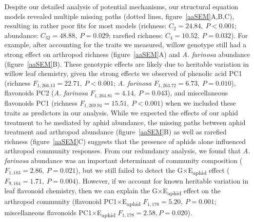 \documentclass[11pt]{article}
\begin{document}
Despite our detailed analysis of potential mechanisms, our structural
equation models revealed multiple missing paths (dotted lines, figure~\ref{aaSEM}A,B,C), resulting in rather poor fits for most models (richness:
\(C_2=24.84,\ P<0.001\); abundance: \(C_{32}=48.88,\ P=0.029\); rarefied richness:
\(C_4=10.52,\ P=0.032\)). For example, after accounting for the traits we
measured, willow genotype still had a strong effect on arthropod
richness (figure~\ref{aaSEM}A) and \textit{A. farinosa} abundance (figure~\ref{aaSEM}B). These genotypic effects are likely due to heritable variation in willow leaf chemistry, given the strong effects we observed of phenolic acid PC1 (richness \(F_{1,266.13} = 22.71,\ P<0.001\); \textit{A. farinosa} \(F_{1,263.72} = 6.73,\ P=0.010\)), flavonoids PC2 (\textit{A. farinosa} \(F_{1,264.81} = 4.14,\ P=0.043\)), and miscellaneous flavonoids PC1 (richness \(F_{1,269.94} = 15.51,\ P<0.001\)) when we included these traits as predictors in our analysis. %
While we expected the effects of our aphid treatment to be mediated by aphid abundance, the missing paths between aphid treatment and arthropod abundance (figure~\ref{aaSEM}B) as well as rarefied richness (figure~\ref{aaSEM}C) suggests that the presence of aphids alone influenced arthropod community responses. 
From our redundancy
analysis, we found that \textit{A. farinosa}
abundance was an important determinant of community composition (\(F_{1,183}=2.86,\ P=0.021\)), %
but we still failed to detect %
the G$\times$E\textsubscript{aphid} effect
(\(F_{9,164}=1.71,\ P=0.004\)). However, if we account for known heritable variation in leaf flavonoid chemistry, then we can explain the G$\times$E\textsubscript{aphid} effect on the arthropod community (flavonoid PC1$\times$E\textsubscript{aphid} \(F_{1,178} = 5.20,\ P=0.001\); miscellaneous flavonoids PC1$\times$E\textsubscript{aphid} \(F_{1,178} = 2.58, P = 0.020\)). %
\end{document}
